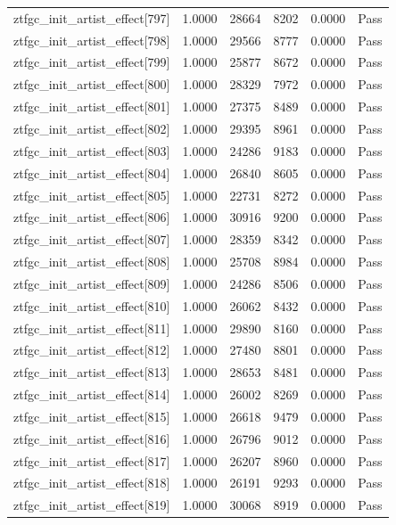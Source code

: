 \begin{table}[htbp]
\begin{tabular}{llrrll}
ztfgc\_init\_artist\_effect[797] & 1.0000 & 28664 & 8202 & 0.0000 & Pass \\
ztfgc\_init\_artist\_effect[798] & 1.0000 & 29566 & 8777 & 0.0000 & Pass \\
ztfgc\_init\_artist\_effect[799] & 1.0000 & 25877 & 8672 & 0.0000 & Pass \\
ztfgc\_init\_artist\_effect[800] & 1.0000 & 28329 & 7972 & 0.0000 & Pass \\
ztfgc\_init\_artist\_effect[801] & 1.0000 & 27375 & 8489 & 0.0000 & Pass \\
ztfgc\_init\_artist\_effect[802] & 1.0000 & 29395 & 8961 & 0.0000 & Pass \\
ztfgc\_init\_artist\_effect[803] & 1.0000 & 24286 & 9183 & 0.0000 & Pass \\
ztfgc\_init\_artist\_effect[804] & 1.0000 & 26840 & 8605 & 0.0000 & Pass \\
ztfgc\_init\_artist\_effect[805] & 1.0000 & 22731 & 8272 & 0.0000 & Pass \\
ztfgc\_init\_artist\_effect[806] & 1.0000 & 30916 & 9200 & 0.0000 & Pass \\
ztfgc\_init\_artist\_effect[807] & 1.0000 & 28359 & 8342 & 0.0000 & Pass \\
ztfgc\_init\_artist\_effect[808] & 1.0000 & 25708 & 8984 & 0.0000 & Pass \\
ztfgc\_init\_artist\_effect[809] & 1.0000 & 24286 & 8506 & 0.0000 & Pass \\
ztfgc\_init\_artist\_effect[810] & 1.0000 & 26062 & 8432 & 0.0000 & Pass \\
ztfgc\_init\_artist\_effect[811] & 1.0000 & 29890 & 8160 & 0.0000 & Pass \\
ztfgc\_init\_artist\_effect[812] & 1.0000 & 27480 & 8801 & 0.0000 & Pass \\
ztfgc\_init\_artist\_effect[813] & 1.0000 & 28653 & 8481 & 0.0000 & Pass \\
ztfgc\_init\_artist\_effect[814] & 1.0000 & 26002 & 8269 & 0.0000 & Pass \\
ztfgc\_init\_artist\_effect[815] & 1.0000 & 26618 & 9479 & 0.0000 & Pass \\
ztfgc\_init\_artist\_effect[816] & 1.0000 & 26796 & 9012 & 0.0000 & Pass \\
ztfgc\_init\_artist\_effect[817] & 1.0000 & 26207 & 8960 & 0.0000 & Pass \\
ztfgc\_init\_artist\_effect[818] & 1.0000 & 26191 & 9293 & 0.0000 & Pass \\
ztfgc\_init\_artist\_effect[819] & 1.0000 & 30068 & 8919 & 0.0000 & Pass \\

\end{tabular}
\end{table}

